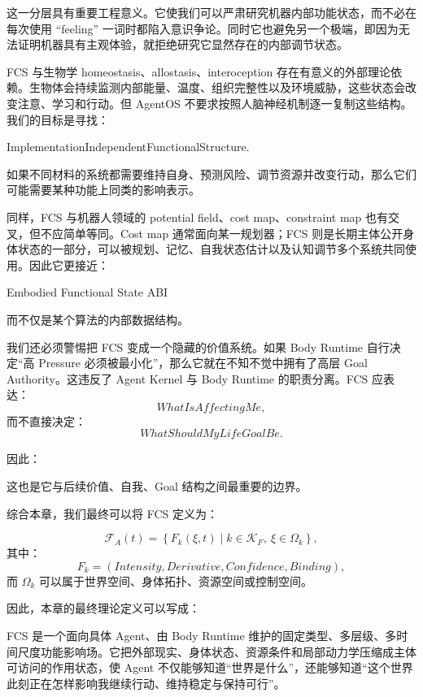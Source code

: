 这一分层具有重要工程意义。它使我们可以严肃研究机器内部功能状态，而不必在每次使用 ``feeling'' 一词时都陷入意识争论。同时它也避免另一个极端，即因为无法证明机器具有主观体验，就拒绝研究它显然存在的内部调节状态。

FCS 与生物学 homeostasis、allostasis、interoception 存在有意义的外部理论依赖。生物体会持续监测内部能量、温度、组织完整性以及环境威胁，这些状态会改变注意、学习和行动。但 AgentOS 不要求按照人脑神经机制逐一复制这些结构。我们的目标是寻找：
\begin{statementbox}
ImplementationIndependentFunctionalStructure.
\end{statementbox}
如果不同材料的系统都需要维持自身、预测风险、调节资源并改变行动，那么它们可能需要某种功能上同类的影响表示。

同样，FCS 与机器人领域的 potential field、cost map、constraint map 也有交叉，但不应简单等同。Cost map 通常面向某一规划器；FCS 则是长期主体公开身体状态的一部分，可以被规划、记忆、自我状态估计以及认知调节多个系统共同使用。因此它更接近：
\begin{statementbox}
Embodied Functional State ABI
\end{statementbox}
而不仅是某个算法的内部数据结构。

我们还必须警惕把 FCS 变成一个隐藏的价值系统。如果 Body Runtime 自行决定“高 Pressure 必须被最小化”，那么它就在不知不觉中拥有了高层 Goal Authority。这违反了 Agent Kernel 与 Body Runtime 的职责分离。FCS 应表达：
\[
WhatIsAffectingMe,
\]
而不直接决定：
\[
WhatShouldMyLifeGoalBe.
\]

因此：
\begin{statementbox}
\centering
{}
\end{statementbox}

这也是它与后续价值、自我、Goal 结构之间最重要的边界。

综合本章，我们最终可以将 FCS 定义为：

\[
\boxed{
\mathcal F_A(t)
=
\left\{
F_k(\xi,t)
\mid
k\in\mathcal K_F,
\ \xi\in\Omega_k
\right\},
}
\]
其中：
\[
F_k
=
(
Intensity,
Derivative,
Confidence,
Binding
),
\]
而 $\Omega_k$ 可以属于世界空间、身体拓扑、资源空间或控制空间。

因此，本章的最终理论定义可以写成：

\begin{definition*}
FCS 是一个面向具体 Agent、由 Body Runtime 维护的固定类型、多层级、多时间尺度功能影响场。它把外部现实、身体状态、资源条件和局部动力学压缩成主体可访问的作用状态，使 Agent 不仅能够知道“世界是什么”，还能够知道“这个世界此刻正在怎样影响我继续行动、维持稳定与保持可行”。
\end{definition*}

